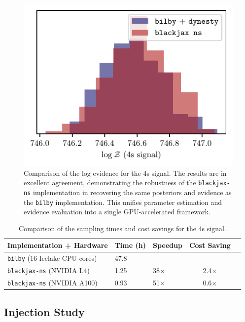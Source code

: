 \documentclass[fleqn,usenatbib]{mnras}
\begin{document}
\begin{figure}
    \centering
    \includegraphics{figures/4s_logZ_comparison.pdf}
    \caption{Comparison of the log evidence for the 4s signal. The results are in excellent agreement, demonstrating the
    robustness of the \texttt{blackjax-ns} implementation in recovering the same posteriors and evidence as the \texttt{bilby} implementation.
    This unifies parameter estimation and evidence evaluation into a single GPU-accelerated framework.}
    \label{fig:4s_logZ_comparison}
\end{figure}

\begin{table}
    \setlength{\tabcolsep}{3pt}
    \centering
    \caption{Comparison of the sampling times and cost savings for the 4s signal.}
    \label{tab:4s_time_comparison}
    \begin{tabular}{l l l c c}
    \hline
    \hline
    \textbf{Implementation + Hardware} & \textbf{Time (h)} & \textbf{Speedup} & \textbf{Cost Saving} \\
    \hline
    \texttt{bilby} (16 Icelake CPU cores) & 47.8 & - & - \\
    \texttt{blackjax-ns} (NVIDIA L4) & 1.25 & 38$\times$ & 2.4$\times$ \\
    \texttt{blackjax-ns} (NVIDIA A100) & 0.93 & 51$\times$ & 0.6$\times$ \\
    \hline
    \hline
    \end{tabular}
    \end{table}


\subsection{Injection Study}
\label{sec:injection_study}
\end{document}
